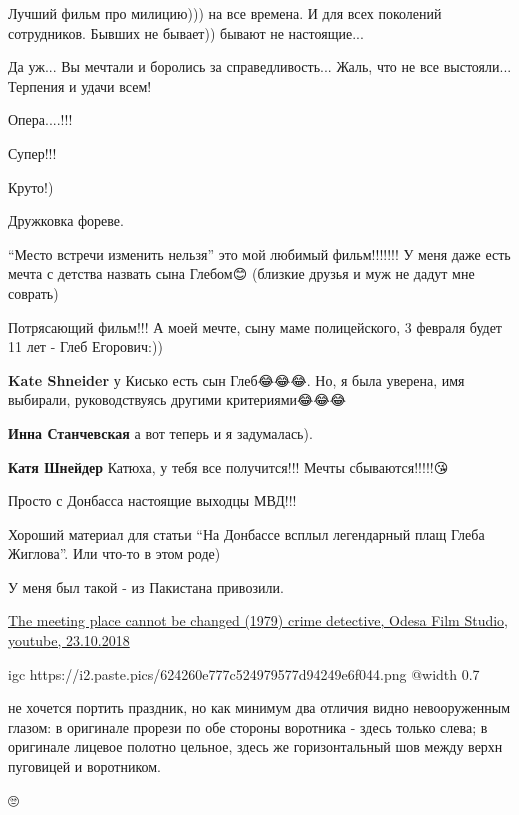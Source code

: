 
Лучший фильм про милицию))) на все времена. И для всех поколений сотрудников.
Бывших не бывает)) бывают не настоящие...


Да уж... Вы мечтали и боролись за справедливость... Жаль, что не все
выстояли... Терпения и удачи всем!


Опера....!!!


Супер!!!


Круто!)


Дружковка фореве.


\enquote{Место встречи изменить нельзя} это мой любимый фильм!!!!!!! У меня даже есть
мечта с детства назвать сына Глебом😊 (близкие друзья и муж не дадут мне
соврать)

\begin{itemize} %

Потрясающий фильм!!! А моей мечте, сыну маме полицейского, 3 февраля будет 11 лет - Глеб Егорович:))

\textbf{Kate Shneider} у Кисько есть сын Глеб😂😂😂. Но, я была уверена, имя выбирали, руководствуясь другими критериями😂😂😂

\textbf{Инна Станчевская} а вот теперь и я задумалась).

\textbf{Катя Шнейдер} Катюха, у тебя все получится!!! Мечты сбываются!!!!!😘
\end{itemize} %


Просто с Донбасса настоящие выходцы МВД!!!


Хороший материал для статьи \enquote{На Донбассе всплыл легендарный плащ Глеба
Жиглова}. Или что-то в этом роде)

\begin{itemize} %
У меня был такой - из Пакистана привозили.
\end{itemize} %


\href{https://www.youtube.com/watch?v=7Ulx-B9MZjg&list=PL3RYZO9qYh_ylEEdAQJdC6b3uHRrizwff&t=10365s}{%
The meeting place cannot be changed (1979) crime detective, Odesa Film Studio, youtube, 23.10.2018%
}

\ifcmt
  igc https://i2.paste.pics/624260e777c524979577d94249e6f044.png
	@width 0.7
\fi

не хочется портить праздник, но как минимум два отличия видно невооруженным
глазом: в оригинале прорези по обе стороны воротника - здесь только слева; в
оригинале лицевое полотно цельное, здесь же горизонтальный шов между верхн
пуговицей и воротником.



🙄
